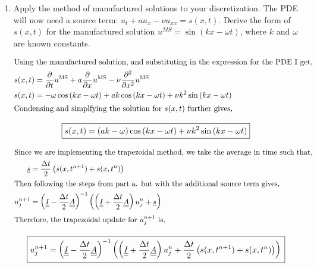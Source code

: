 \pagebreak
\begin{enumerate}[label=\alph*., start = 2]
    \item Apply the method of manufactured solutions to your discretization.  The PDE will now need a source term: $u_t+au_x - \nu u_{xx}=s(x,t)$. Derive the form of $s(x,t)$ for the manufactured solution $u^{MS}= \sin{(kx -\omega t)}$, where $k$ and $\omega$ are known constants.
    
    \vspace{-0.35in}
    \begin{align*}
        \shortintertext{Using the manufactured solution, and substituting in the expression for the PDE I get,}
        s(x,t) & = \frac{\partial}{\partial t}u^\text{MS} + a\frac{\partial}{\partial x}u^\text{MS} - \nu \frac{\partial^2}{\partial x^2}u^\text{MS}\\
        s(x,t) & = -\omega\cos{(kx - \omega t)} + ak\cos{(kx-\omega t)} + \nu k^2\sin{(kx-\omega t)}\\
        \shortintertext{Condensing and simplfying the solution for $s(x,t)$ further gives,}
    \end{align*}

    \vspace{-0.5in}
    \begin{equation*}
        \boxed{s(x,t) = \left(ak - \omega\right)\cos{(kx - \omega t)} + \nu k^2\sin{(kx-\omega t)}\\}
    \end{equation*}

    \vspace{-0.45in}
    \begin{align*}
        \shortintertext{Since we are implementing the trapezoidal method, we take the average in time such that,}
        \underline{s} & = \frac{\Delta t}{2}\left(s(x,t^{n+1}) + s(x,t^{n})\right)\\
        \shortintertext{Then following the steps from part a. but with the additional source term gives,}
        u_j^{n+1} & = \left(\underline{\underline{I}} - \frac{\Delta t}{2}\underline{\underline{A}}\right)^{-1}\left( \left(\underline{\underline{I}} + \frac{\Delta t}{2}\underline{\underline{A}}\right)u^n_j + \underline{s}\right)\\
        \shortintertext{Therefore, the trapezoidal update for $u^{n+1}_j$ is,}
    \end{align*}

    \vspace{-0.35in}
    \begin{equation*}
        \boxed{u_j^{n+1} = \left(\underline{\underline{I}} - \frac{\Delta t}{2}\underline{\underline{A}}\right)^{-1}\left( \left(\underline{\underline{I}} + \frac{\Delta t}{2}\underline{\underline{A}}\right)u^n_j + \frac{\Delta t}{2}\left(s(x,t^{n+1}) + s(x,t^{n})\right)\right)\\}
    \end{equation*}

\end{enumerate}

